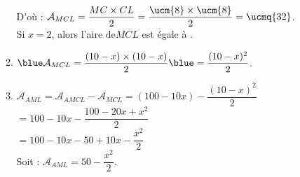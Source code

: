 \begin{enumerate}
\begin{enumerate}
            D'où : $\mathcal{A}_{MCL} =\dfrac{MC\times CL}{2} =\dfrac{\ucm{8}\times\ucm{8}}{2} =\ucmq{32}$. \\ [1mm]
              {\blue Si $x =2$, alors l’aire de$MCL$ est égale à }. \smallskip
            \item ${\blue \mathcal{A}_{MCL}} =\dfrac{(10-x)\times(10-x)}{2} {\blue =\dfrac{(10-x)^2}{2}}$. \\
            \item $\mathcal{A}_{AML} =\mathcal{A}_{AMCL}-\mathcal{A}_{MCL} =(100-10x)-\dfrac{(10-x)^2}{2}$ \\ [1mm]
               \hspace*{4.2cm} $=100-10x-\dfrac{100-20x+x^2}{2}$  \\ [1mm]
               \hspace*{4.2cm} $=100-10x-50+10x-\dfrac{x^2}{2}$ \\ [1mm]
               Soit : {\blue $\mathcal{A}_{AML} =50-\dfrac{x^2}{2}$}.
         \end{enumerate}
   \end{enumerate}

